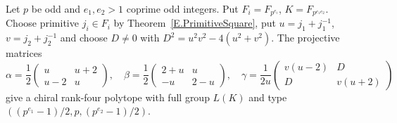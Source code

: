 \begin{theorem}\label{E.CoprimeConstruction}
Let $p$ be odd and $e_1,e_2>1$ coprime odd integers. Put
$F_i=F_{p^{e_i}}$, $K=F_{p^{e_1e_2}}$. Choose primitive $j_i\in F_i$
by Theorem~\ref{E.PrimitiveSquare}, put $u=j_1+j_1^{-1}$,
$v=j_2+j_2^{-1}$ and choose $D\ne0$ with
$D^2=u^2v^2-4(u^2+v^2)$. The projective matrices
\[
 \alpha=\frac12\begin{pmatrix}u&u+2\\u-2&u\end{pmatrix},\quad
 \beta=\frac12\begin{pmatrix}2+u&u\\-u&2-u\end{pmatrix},\quad
 \gamma=\frac1{2u}\begin{pmatrix}v(u-2)&D\\D&v(u+2)\end{pmatrix}
\]
give a chiral rank-four polytope with full group $L(K)$ and type
$((p^{e_1}-1)/2,p,(p^{e_2}-1)/2)$.
\end{theorem}
